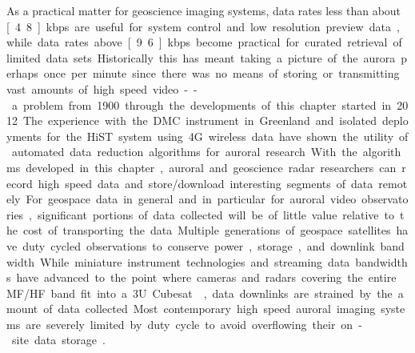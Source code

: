As a practical matter for geoscience imaging systems, data rates less than about \unit[4.8]{kbps} are useful for system control and low resolution preview data, while data rates above \unit[9.6]{kbps} become practical for curated retrieval of limited data sets.
Historically this has meant taking a picture of the aurora perhaps once per minute since there was no means of storing or transmitting vast amounts of high speed video--a problem from 1900 through the developments of this chapter started in 2012.
The experience with the DMC instrument in Greenland and isolated deployments for the HiST system using 4G wireless data have shown the utility of automated data reduction algorithms for auroral research.
With the algorithms developed in this chapter, auroral and geoscience radar researchers can record high speed data and store/download interesting segments of data remotely.

For geospace data in general and in particular for auroral video observatories, significant portions of data collected will be of little value relative to the cost of transporting the data.
Multiple generations of geospace satellites have duty cycled observations to conserve power, storage, and downlink bandwidth.
While miniature instrument technologies and streaming data bandwidths have  advanced to the point where cameras and radars covering the entire MF/HF band fit into a 3U Cubesat \citep{knapp2016}, data downlinks are strained by the amount of data collected.
Most contemporary high speed auroral imaging systems are severely limited by duty cycle to avoid overflowing their on-site data storage \citep{fukuda2016}.

